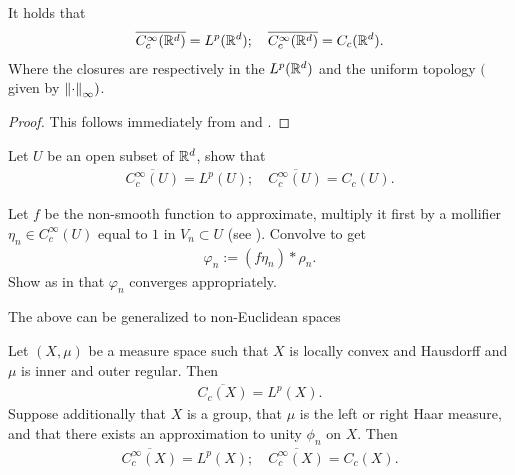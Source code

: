 \documentclass[
    a4paper,
    DIV=14,
    abstract=true,
    numbers=noenddot
]{scrartcl}
\begin{document}
\begin{theorem}\label{density thm}It holds that
	\begin{align*}
		\overline{C_c^\infty(\mathbb{R}^d)}= L^p(\mathbb{R}^d); \quad \overline{C_c^\infty(\mathbb{R}^d)} = C_c(\mathbb{R}^d).
	\end{align*}
	Where the closures are respectively in the $L^p(\mathbb{R}^d)$ and the uniform topology $($given by $\left\lVert \cdot  \right\rVert_{\infty})$.
\end{theorem}
\begin{proof}
	This follows immediately from  and .
\end{proof}
\begin{exercise}Let $U$ be an open subset of  $\mathbb{R}^d$, show that
	\begin{align*}
		\overline{C_c^\infty(U)}= L^p(U); \quad \overline{C_c^\infty(U)} = C_c(U).
	\end{align*}
\end{exercise}
\begin{hint}
	Let $f$ be the non-smooth function to approximate, multiply it first by a mollifier $\eta_n \in C_c^\infty(U)$ equal to $1$ in $ V_n\subset U$ (see ). Convolve to get
	\begin{align*}
		\varphi_n:=(f \eta_n )*\rho _n.
	\end{align*}
	Show as in  that $\varphi_n$ converges appropriately.
\end{hint}
The above can be generalized to non-Euclidean spaces
\begin{theorem}
	Let $(X,\mu )$ be a measure space such that $X$ is locally convex and Hausdorff and  $\mu $ is inner and outer regular. Then
	\begin{align*}
		\overline{C_c(X)} =L^p(X).
	\end{align*}
	Suppose additionally that $X$ is a group, that $\mu $ is the left or right Haar measure, and that there exists an approximation to unity $\phi_n$ on $X$. Then
	\begin{align*}
		\overline{C_c^\infty(X)} =L^p(X);\quad \overline{C_c^\infty(X)} =C_c(X).
	\end{align*}
\end{theorem}
\end{document}
